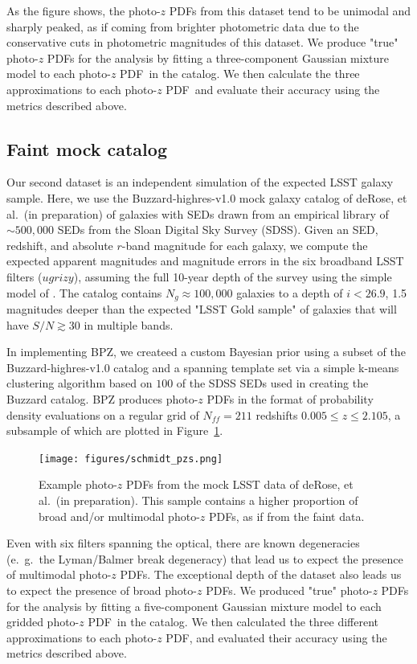 \documentclass[\docopts]{\docclass}
\newcommand{\pz}{photo-$z$ PDF}
\newcommand{\ssdata}{faint\xspace}
\newcommand{\Ssdata}{Faint\xspace}
\begin{document}
As the figure shows, the \pz s from this dataset tend to be unimodal and 
sharply peaked, as if coming from brighter photometric data due to the 
conservative cuts in photometric magnitudes of this dataset.
We produce "true" \pz s for the analysis by fitting a three-component Gaussian 
mixture model to each \pz\ in the catalog.
We then calculate the three approximations to each \pz\ and evaluate their 
accuracy using the metrics described above.

\subsection{\Ssdata mock catalog}
\label{sec:schmidt}

Our second dataset is an independent simulation of the expected LSST galaxy 
sample.
Here, we use the Buzzard-highres-v1.0 mock galaxy catalog of deRose, et al.\ 
(in preparation) of galaxies with SEDs drawn from an empirical library of 
$\sim500,000$ SEDs from the Sloan Digital Sky Survey (SDSS).
Given an SED, redshift, and absolute $r$-band magnitude for each galaxy, we 
compute the expected apparent magnitudes and magnitude errors in the six 
broadband LSST filters ($ugrizy$), assuming the full 10-year depth of the 
survey using the simple model of \citet{ivezic_lsst:_2008}.
The catalog contains $N_{g}\approx100,000$ galaxies to a depth of $i<26.9$, 1.5 
magnitudes deeper than the expected "LSST Gold sample" of galaxies that will 
have $S/N\gtrsim30$ in multiple bands.

In implementing BPZ, we createed a custom Bayesian prior using a subset of the 
Buzzard-highres-v1.0 catalog and a spanning template set via a simple k-means 
clustering algorithm based on $100$ of the SDSS SEDs used in creating the 
Buzzard catalog.
BPZ produces \pz s in the format of probability density evaluations on a 
regular grid of $N_{ff}=211$ redshifts $0.005\leq z\leq2.105$, a subsample of 
which are plotted in Figure~\ref{fig:schmidt_pzs}.

\begin{figure}
  \texttt{[image: figures/schmidt\_pzs.png]}
  \caption{Example \pz s from the mock LSST data of deRose, et al.\ (in 
preparation).
  This sample contains a higher proportion of broad and/or multimodal \pz s, as 
if from the \ssdata data.
  \label{fig:schmidt_pzs}}
\end{figure}

Even with six filters spanning the optical, there are known degeneracies 
(e.~g.~the Lyman/Balmer break degeneracy) that lead us to expect the presence 
of multimodal \pz s.
The exceptional depth of the dataset also leads us to expect the presence of 
broad \pz s.
We produced "true" \pz s for the analysis by fitting a five-component Gaussian 
mixture model to each gridded \pz\ in the catalog.
We then calculated the three different approximations to each \pz, and 
evaluated their accuracy using the metrics described above.
\end{document}
